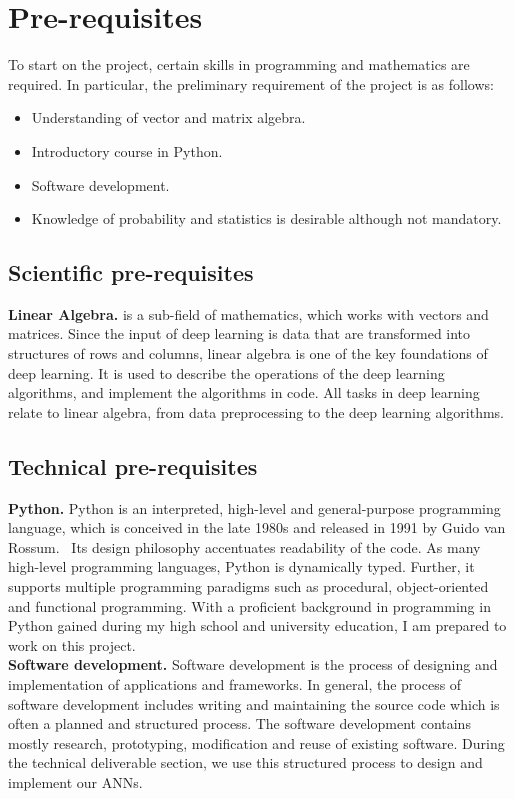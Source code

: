 
\section{Pre-requisites} 

To start on the project, certain skills in programming and mathematics are
required. In particular, the preliminary requirement of the project is as
follows:~\\
\begin{itemize}
        \item Understanding of vector and matrix algebra.
        \item Introductory course in Python.
        \item Software development.
        \item Knowledge of probability and statistics is desirable although not
          mandatory.
\end{itemize}

\subsection{Scientific pre-requisites}

\textbf{Linear Algebra.} is a sub-field of mathematics, which works with vectors
and matrices. Since the input of deep learning is data that are transformed into
structures of rows and columns, linear algebra is one of the key foundations of
deep learning. It is used to describe the operations of the deep learning
algorithms, and implement the algorithms in code. All tasks in deep learning
relate to linear algebra, from data preprocessing to the deep learning
algorithms.~\cite{Goodfellow-et-al-2016}

\subsection{Technical pre-requisites}

\textbf{Python.} Python is an interpreted, high-level and general-purpose
programming language, which is conceived in the late 1980s and released in 1991
by Guido van Rossum.~\cite{PyRo} Its design philosophy accentuates readability
of the code.  As many high-level programming languages, Python is dynamically
typed. Further, it supports multiple programming paradigms such as procedural,
object-oriented and functional programming. With a proficient background in
programming in Python gained during my high school and university education, I
am prepared to work on this project.\\

\textbf{Software development.} Software development is the process of designing
and implementation of applications and frameworks. In general, the process of
software development includes writing and maintaining the source code which is
often a planned and structured process. The software development contains mostly
research, prototyping, modification and reuse of existing software. During the
technical deliverable section, we use this structured process to design and
implement our ANNs. 
